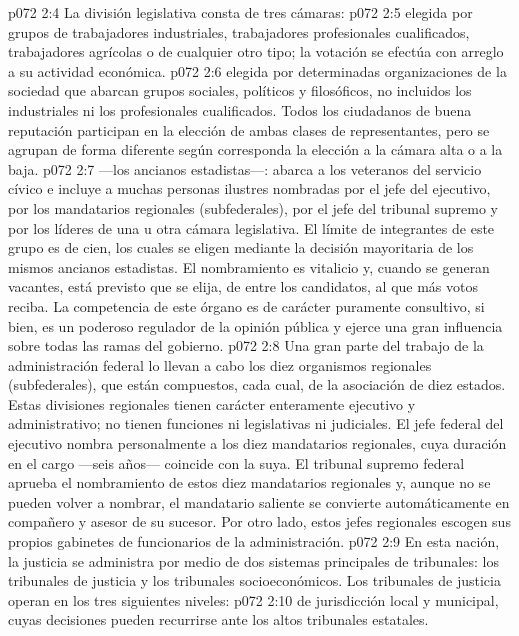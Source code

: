 \vs p072 2:4 \pc La división legislativa consta de tres cámaras:
\vs p072 2:5  elegida por grupos de trabajadores industriales, trabajadores profesionales cualificados, trabajadores agrícolas o de cualquier otro tipo; la votación se efectúa con arreglo a su actividad económica.
\vs p072 2:6  elegida por determinadas organizaciones de la sociedad que abarcan grupos sociales, políticos y filosóficos, no incluidos los industriales ni los profesionales cualificados. Todos los ciudadanos de buena reputación participan en la elección de ambas clases de representantes, pero se agrupan de forma diferente según corresponda la elección a la cámara alta o a la baja.
\vs p072 2:7  ---los ancianos estadistas---: abarca a los veteranos del servicio cívico e incluye a muchas personas ilustres nombradas por el jefe del ejecutivo, por los mandatarios regionales (subfederales), por el jefe del tribunal supremo y por los líderes de una u otra cámara legislativa. El límite de integrantes de este grupo es de cien, los cuales se eligen mediante la decisión mayoritaria de los mismos ancianos estadistas. El nombramiento es vitalicio y, cuando se generan vacantes, está previsto que se elija, de entre los candidatos, al que más votos reciba. La competencia de este órgano es de carácter puramente consultivo, si bien, es un poderoso regulador de la opinión pública y ejerce una gran influencia sobre todas las ramas del gobierno.
\vs p072 2:8 \pc Una gran parte del trabajo de la administración federal lo llevan a cabo los diez organismos regionales (subfederales), que están compuestos, cada cual, de la asociación de diez estados. Estas divisiones regionales tienen carácter enteramente ejecutivo y administrativo; no tienen funciones ni legislativas ni judiciales. El jefe federal del ejecutivo nombra personalmente a los diez mandatarios regionales, cuya duración en el cargo ---seis años--- coincide con la suya. El tribunal supremo federal aprueba el nombramiento de estos diez mandatarios regionales y, aunque no se pueden volver a nombrar, el mandatario saliente se convierte automáticamente en compañero y asesor de su sucesor. Por otro lado, estos jefes regionales escogen sus propios gabinetes de funcionarios de la administración.
\vs p072 2:9 \pc En esta nación, la justicia se administra por medio de dos sistemas principales de tribunales: los tribunales de justicia y los tribunales socioeconómicos. Los tribunales de justicia operan en los tres siguientes niveles:
\vs p072 2:10  de jurisdicción local y municipal, cuyas decisiones pueden recurrirse ante los altos tribunales estatales.
